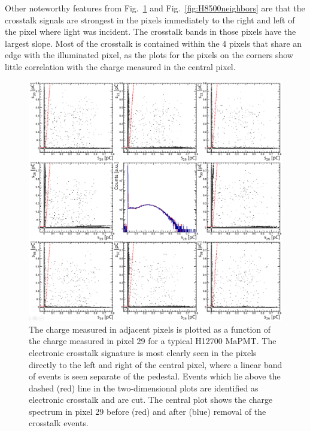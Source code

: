 Other noteworthy features from Fig.~\ref{fig:H12700neighbors} and Fig.~\ref{fig:H8500neighbors} are that the crosstalk signals are strongest in the pixels immediately to the right and left of the pixel where light was incident. The crosstalk bands in those pixels have the largest slope. Most of the crosstalk is contained within the 4 pixels that share an edge with the illuminated pixel, as the plots for the pixels on the corners show little correlation with the charge measured in the central pixel.

\begin{figure}[h!bt]
	\centering
	\includegraphics[width=0.9\linewidth]{figures/H12700_ct_v2.png}
	\caption{The charge measured in adjacent pixels is plotted as a function of the charge measured in pixel 29 for a typical H12700 MaPMT. The electronic crosstalk signature is most clearly seen in the pixels directly to the left and right of the central pixel, where a linear band of events is seen separate of the pedestal. Events which lie above the dashed (red) line in the two-dimensional plots are identified as electronic crosstalk and are cut. The central plot shows the charge spectrum in pixel 29 before (red) and after (blue) removal of the crosstalk events.}
	\label{fig:H12700neighbors}
\end{figure}
